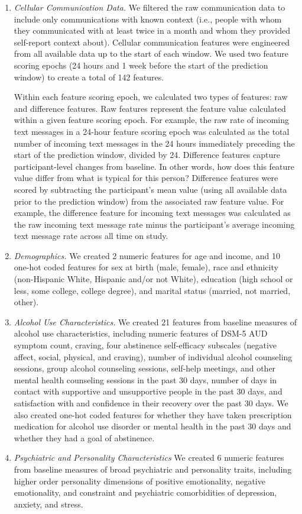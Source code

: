 \documentclass[
  letterpaper,
  DIV=11,
  numbers=noendperiod]{scrartcl}
\begin{document}
\begin{enumerate}
\def\labelenumi{\arabic{enumi}.}
\item
  \emph{Cellular Communication Data.} We filtered the raw communication
  data to include only communications with known context (i.e., people
  with whom they communicated with at least twice in a month and whom
  they provided self-report context about). Cellular communication
  features were engineered from all available data up to the start of
  each window. We used two feature scoring epochs (24 hours and 1 week
  before the start of the prediction window) to create a total of 142
  features.

  Within each feature scoring epoch, we calculated two types of
  features: raw and difference features. Raw features represent the
  feature value calculated within a given feature scoring epoch. For
  example, the raw rate of incoming text messages in a 24-hour feature
  scoring epoch was calculated as the total number of incoming text
  messages in the 24 hours immediately preceding the start of the
  prediction window, divided by 24. Difference features capture
  participant-level changes from baseline. In other words, how does this
  feature value differ from what is typical for this person? Difference
  features were scored by subtracting the participant's mean value
  (using all available data prior to the prediction window) from the
  associated raw feature value. For example, the difference feature for
  incoming text messages was calculated as the raw incoming text message
  rate minus the participant's average incoming text message rate across
  all time on study.
\item
  \emph{Demographics.} We created 2 numeric features for age and income,
  and 10 one-hot coded features for sex at birth (male, female), race
  and ethnicity (non-Hispanic White, Hispanic and/or not White),
  education (high school or less, some college, college degree), and
  marital status (married, not married, other).
\item
  \emph{Alcohol Use Characteristics.} We created 21 features from
  baseline measures of alcohol use characteristics, including numeric
  features of DSM-5 AUD symptom count, craving, four abstinence
  self-efficacy subscales (negative affect, social, physical, and
  craving), number of individual alcohol counseling sessions, group
  alcohol counseling sessions, self-help meetings, and other mental
  health counseling sessions in the past 30 days, number of days in
  contact with supportive and unsupportive people in the past 30 days,
  and satisfaction with and confidence in their recovery over the past
  30 days. We also created one-hot coded features for whether they have
  taken prescription medication for alcohol use disorder or mental
  health in the past 30 days and whether they had a goal of abstinence.
\item
  \emph{Psychiatric and Personality Characteristics} We created 6
  numeric features from baseline measures of broad psychiatric and
  personality traits, including higher order personality dimensions of
  positive emotionality, negative emotionality, and constraint and
  psychiatric comorbidities of depression, anxiety, and stress.
\end{enumerate}
\end{document}
